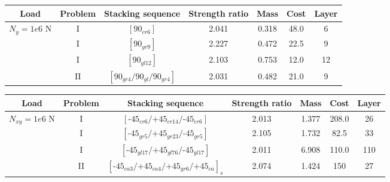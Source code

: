 \documentclass[smallextended]{svjour3}       %
\begin{document}
\begin{tabular}{ccccccc}
	\toprule
	Load                             &Problem & Stacking sequence        & Strength ratio  & Mass &  Cost   & Layer    \\
	\midrule
	 \multirow{4}{*}{$N_{y}=1e6$ N}  &  I        &  $[90_{cr6}]$                             & 2.041           & 0.318 &  48.0  & 6  \\
					                 &  I        &  $[90_{gr9}]$                      & 2.227           & 0.472 &  22.5  & 9  \\
           		 	                 &  I        &  $[90_{gl12}]$                             & 2.103           & 0.753 &  12.0  & 12  \\
									 &  II       &  $[90_{gr4}/90_{gl}/90_{gr4}]$                      & 2.031           & 0.482 &  21.0  & 9 \\
	\bottomrule
\end{tabular}


\begin{tabular}{ccccccc}
	\toprule
	Load                               &Problem   & Stacking sequence        & Strength ratio  & Mass &  Cost   & Layer    \\
	\midrule
	\multirow{4}{*}{$N_{xy}=1e6$ N}	   &    I      &  $[\text{-}45_{cr6}/\text{+}45_{cr14}/\text{-}45_{cr6}]$                  & 2.013           & 1.377 &  208.0  & 26  \\
									   &    I      &  $[\text{-}45_{gr5}/\text{+}45_{gr23}/\text{-}45_{gr5}]$                & 2.105           & 1.732 &  82.5   & 33  \\
									   &    I      &  $[\text{-}45_{gl17}/\text{+}45_{gl76}/\text{-}45_{gl17}]$               & 2.011           & 6.908 &  110.0  & 110  \\
									   &    II     &  $[\text{-}45_{ca3}/\text{+}45_{ca4}/\text{+}45_{gr6}/\text{+}45_{ca}]_s$    & 2.074    & 1.424 &  150    & 27 \\
	\bottomrule
\end{tabular}
\end{document}
